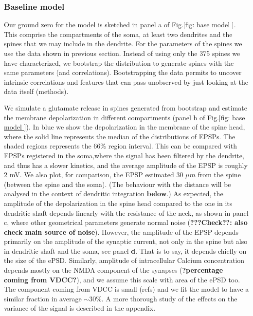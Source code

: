 \documentclass[10pt,letterpaper]{article}
\begin{document}
\subsubsection*{Baseline model}
Our ground zero for the model is sketched in panel a of Fig.\ref{fig: base model }. This comprise the compartments of the soma, at least two dendrites and the spines that we may include in the dendrite. For the parameters of the spines we use the data shown in previous section. Instead of using only the 375 spines we have characterized, we bootstrap the distribution to generate spines with the same parameters (and correlations). Bootstrapping the data permits to uncover intrinsic correlations and features that can pass unobserved by just looking at the data itself (methods). 

We simulate a glutamate release in spines generated from bootstrap and estimate the membrane depolarization in different compartments (panel b of Fig.\ref{fig: base model }). In blue we show the depolarization in the membrane of the spine head, where the solid line represents the median of the distributions of EPSPs. The shaded regions represents the 66\% region interval. This can be compared with EPSPs registered in the soma,where the signal has been filtered by the dendrite, and thus has a slower kinetics, and the average amplitude of the EPSP is roughly 2 mV. We also plot, for comparison, the EPSP estimated 30 $\mu m$ from the spine (between the spine and the soma). (The behaviour with the distance will be analysed in the context of dendritic integration {\bf below}.) As expected, the amplitude of the depolarization in the spine head compared to the one in its dendritic shaft depends linearly with the resistance of the neck, as shown in panel c, where other geometrical parameters generate normal noise ({\bf ???Check??: also check main source of noise}). However, the amplitude of the EPSP depends primarily on the amplitude of the synaptic current, not only in the spine but also in dendritic shaft and the soma, see panel {\bf d}. That is to say, it depends chiefly on the size of the ePSD. Similarly, amplitude of intracellular Calcium concentration depends mostly on the NMDA component of the synapses ({\bf ?percentage coming from VDCC?}), and we assume this scale with area of the ePSD too. The component coming from VDCC is small (refs) and we fit the model to have a similar fraction in average $\sim 30\%$. A more thorough study of the effects on the variance of the signal is described in the appendix.
\end{document}
